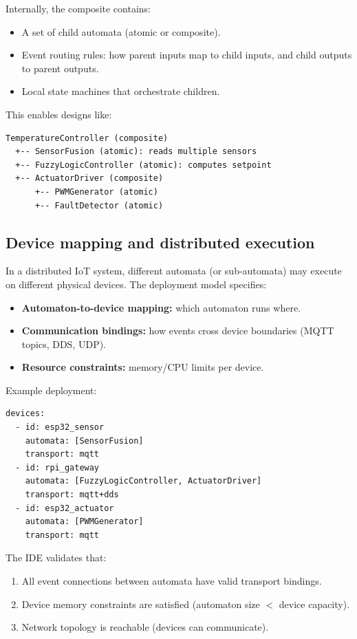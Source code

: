 Internally, the composite contains:
\begin{itemize}
  \item A set of child automata (atomic or composite).
  \item Event routing rules: how parent inputs map to child inputs, and child outputs to parent outputs.
  \item Local state machines that orchestrate children.
\end{itemize}


This enables designs like:
\begin{verbatim}
TemperatureController (composite)
  +-- SensorFusion (atomic): reads multiple sensors
  +-- FuzzyLogicController (atomic): computes setpoint
  +-- ActuatorDriver (composite)
      +-- PWMGenerator (atomic)
      +-- FaultDetector (atomic)
\end{verbatim}

\subsection{Device mapping and distributed execution}

In a distributed IoT system, different automata (or sub-automata) may execute on different physical devices.
The deployment model specifies:
\begin{itemize}
  \item \textbf{Automaton-to-device mapping:} which automaton runs where.
  \item \textbf{Communication bindings:} how events cross device boundaries (MQTT topics, DDS, UDP).
  \item \textbf{Resource constraints:} memory/CPU limits per device.
\end{itemize}

Example deployment:
\begin{verbatim}
devices:
  - id: esp32_sensor
    automata: [SensorFusion]
    transport: mqtt
  - id: rpi_gateway
    automata: [FuzzyLogicController, ActuatorDriver]
    transport: mqtt+dds
  - id: esp32_actuator
    automata: [PWMGenerator]
    transport: mqtt
\end{verbatim}

The IDE validates that:
\begin{enumerate}
  \item All event connections between automata have valid transport bindings.
  \item Device memory constraints are satisfied (automaton size $<$ device capacity).
  \item Network topology is reachable (devices can communicate).
\end{enumerate}

